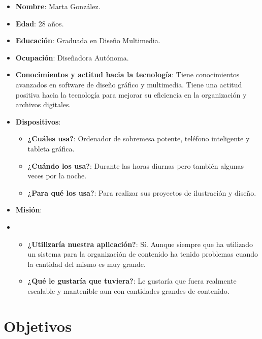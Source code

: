     \begin{itemize}
        \item \textbf{Nombre}: Marta González.
        \item \textbf{Edad}: 28 años.
        \item \textbf{Educación}: Graduada en Diseño Multimedia.
        \item \textbf{Ocupación}: Diseñadora Autónoma.
        \item \textbf{Conocimientos y actitud hacia la tecnología}: Tiene conocimientos avanzados en software de diseño gráfico y multimedia. Tiene una actitud positiva hacia la tecnología para mejorar su eficiencia en la organización y archivos digitales.
        \item \textbf{Dispositivos}:
            \begin{itemize}

            \item \textbf{¿Cuáles usa?}: Ordenador de sobremesa potente, teléfono inteligente y tableta gráfica.
            \item \textbf{¿Cuándo los usa?}: Durante las horas diurnas pero también algunas veces por la noche.
            \item \textbf{¿Para qué los usa?}: Para realizar sus proyectos de ilustración y diseño.

            \end{itemize}
        \item \textbf{Misión}:
        \item 
            \begin{itemize}

                \item \textbf{¿Utilizaría nuestra aplicación?}: Sí. Aunque siempre que ha utilizado un sistema para la organización de contenido ha tenido problemas cuando la cantidad del mismo es muy grande.

                \item \textbf{¿Qué le gustaría que tuviera?}: Le gustaría que fuera realmente escalable y mantenible aun con cantidades grandes de contenido.

            \end{itemize}
        
    \end{itemize}

\section{Objetivos}

